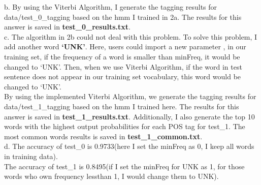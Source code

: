 \documentclass[11pt]{article}
\begin{document}
	b. By using the Viterbi Algorithm, I generate the tagging results for data/test\_0\_tagging based on the hmm I trained in 2a. The results for this answer is saved in \textbf{test\_0\_results.txt}.\\
	
	c. The algorithm in 2b could not deal with this problem. To solve this problem, I add another word \textbf{`UNK'}. Here, users could import a new parameter , in our training set, if the frequency of a word is smaller than minFreq, it would be changed to `UNK'. Then, when we use Viterbi Algorithm, if the word in test sentence does not appear in our training set vocabulary, this word would be changed to `UNK'.\\
	By using the implemented Viterbi Algorithm, we generate the tagging results for data/test\_1\_tagging based on the hmm I trained here. The results for this answer is saved in \textbf{test\_1\_results.txt}. Additionally, I also generate the top 10 words with the highest output probabilities for each POS tag for test\_1. The most common words results is saved in \textbf{test\_1\_common.txt}.\\
	
	d. The accuracy of test\_0 is 0.9733(here I set the minFreq as 0, I keep all words in training data).\\
	The accuracy of test\_1 is 0.8495(if I set the minFreq for UNK as 1, for those words who own frequency lessthan 1, I would change them to UNK).
		
\end{document}
